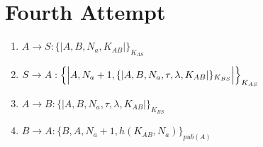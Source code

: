 \section{Fourth Attempt}

\begin{enumerate}
    \item $ A \rightarrow S : \{|A, B, N_a, K_{AB}|\}_{K_{AS}}$
    \item $ S \rightarrow A : \Bigl\{\Bigl|A, N_a + 1, \{|A,B,N_a, \tau, \lambda, K_{AB}|\}_{K_{BS}}\Bigr|\Bigr\}_{K_{AS}}$
    \item $ A \rightarrow B : \{|A,B,N_a, \tau, \lambda, K_{AB} |\}_{K_{BS}}$
    \item $ B \rightarrow A : \{B, A, N_a+1, h(K_{AB}, N_a)\}_{pub(A)}$


\end{enumerate}